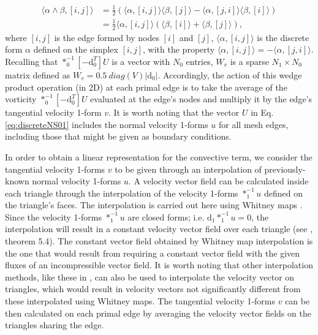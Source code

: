 \documentclass[final,12pt,times]{elsarticle}
\begin{document}
\begin{equation}
\label{eq:discreteWedge2D}
\begin{aligned}
\langle \alpha \wedge \beta , [i,j] \rangle  &= \frac{1}{2} \left( \langle \alpha, [i,j] \rangle  \langle \beta, [j] \rangle - \langle \alpha, [j,i] \rangle  \langle \beta, [i] \rangle \right) \\ &= \frac{1}{2} \langle \alpha, [i,j] \rangle (  \langle \beta, [i] \rangle +  \langle \beta, [j] \rangle ),  
\end{aligned}
\end{equation}
where $[i,j]$ is the edge formed by nodes $[i]$ and $[j]$, $\langle \alpha, [i,j] \rangle$ is the discrete form $\alpha$ defined on the simplex $[i,j]$, with the property $\langle \alpha, [i,j] \rangle = - \langle \alpha, [j,i] \rangle$. Recalling that $\ast^{-1}_0 [-\textrm{d}^T_0] U$ is a vector with $N_0$ entries, $W_v$ is a sparse $N_1 \times N_0$ matrix defined as $W_v = 0.5 \ diag(V) |\textrm{d}_0|$. Accordingly, the action of this wedge product operation (in 2D) at each primal edge is to take the average of the vorticity $\ast^{-1}_0 [-\textrm{d}^T_0] U$ evaluated at the edge's nodes and multiply it by the edge's tangential velocity 1-form $v$. It is worth noting that the vector $U$ in Eq. \eqref{eq:discreteNS01} includes the normal velocity 1-forms $u$ for all mesh edges, including those that might be given as boundary conditions. 

In order to obtain a linear representation for the convective term, we consider the tangential velocity 1-forms $v$ to be given through an interpolation of previously-known normal velocity 1-forms $u$. A velocity vector field can be calculated inside each triangle through the interpolation of the velocity 1-forms $\ast_1^{-1} u$ defined on the triangle's faces. The interpolation is carried out here using Whitney maps \cite{HiNaCh2015}. Since the velocity 1-forms $\ast_1^{-1} u$ are closed forms; i.e. $\textrm{d}_1 \ast_1^{-1} u = 0$, the interpolation will result in a constant velocity vector field over each triangle (see \cite{arnold2010finite}, theorem 5.4). The constant vector field obtained by Whitney map interpolation is the one that would result from requiring a constant vector field with the given fluxes of an incompressible vector field. It is worth noting that other interpolation methods, like these in \cite{HallCavendish:1991dvmsvf}, can also be used to interpolate the velocity vector on triangles, which would result in velocity vectors not significantly different from these interpolated using Whitney maps. The tangential velocity 1-forms $v$ can be then calculated on each primal edge by averaging the velocity vector fields on the triangles sharing the edge. 
\end{document}
